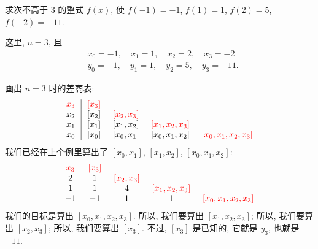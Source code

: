 \begin{example}
    求次不高于 $3$ 的整式 $f(x)$, 使 $f(-1)=-1$, $f(1)=1$, $f(2)=5$, $f(-2) = -11$.

    这里, $n = 3$, 且
    \begin{align*}
         & x_0 = -1, \quad x_1 = 1, \quad x_2 = 2, \quad x_3 = -2   \\
         & y_0 = -1, \quad y_1 = 1, \quad y_2 = 5, \quad y_3 = -11.
    \end{align*}

    画出 $n = 3$ 时的差商表:
    \begin{align*}
        \arraycolsep=0.25cm
        \begin{array}{c|cccc}
            \textcolor{red}{x_3} & \textcolor{red}{[x_3]} & \                           & \                                & \                                     \\
            x_2                  & [x_2]                  & \textcolor{red}{[x_2, x_3]} & \                                & \                                     \\
            x_1                  & [x_1]                  & [x_1, x_2]                  & \textcolor{red}{[x_1, x_2, x_3]} & \                                     \\
            x_0                  & [x_0]                  & [x_0, x_1]                  & [x_0, x_1, x_2]                  & \textcolor{red}{[x_0, x_1, x_2, x_3]} \\
        \end{array}
    \end{align*}
    我们已经在上个例里算出了 $[x_0, x_1]$, $[x_1, x_2]$, $[x_0, x_1, x_2]$:
    \begin{align*}
        \arraycolsep=0.25cm
        \begin{array}{c|cccc}
            \textcolor{red}{x_3} & \textcolor{red}{[x_3]} & \                           & \                                & \                                     \\
            2                    & 1                      & \textcolor{red}{[x_2, x_3]} & \                                & \                                     \\
            1                    & 1                      & 4                           & \textcolor{red}{[x_1, x_2, x_3]} & \                                     \\
            -1                   & -1                     & 1                           & 1                                & \textcolor{red}{[x_0, x_1, x_2, x_3]} \\
        \end{array}
    \end{align*}
    我们的目标是算出 $[x_0, x_1, x_2, x_3]$. 所以, 我们要算出 $[x_1, x_2, x_3]$; 所以, 我们要算出 $[x_2, x_3]$; 所以, 我们要算出 $[x_3]$. 不过, $[x_3]$ 是已知的, 它就是 $y_3$, 也就是 $-11$.


\end{example}
